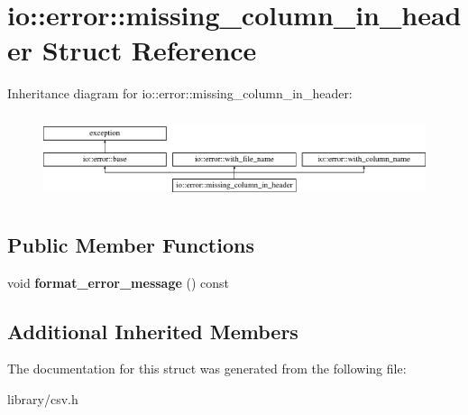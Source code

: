 \hypertarget{structio_1_1error_1_1missing__column__in__header}{}\section{io\+:\+:error\+:\+:missing\+\_\+column\+\_\+in\+\_\+header Struct Reference}
\label{structio_1_1error_1_1missing__column__in__header}
Inheritance diagram for io\+:\+:error\+:\+:missing\+\_\+column\+\_\+in\+\_\+header\+:\begin{figure}[H]
\begin{center}
\leavevmode
\includegraphics[height=2.511211cm]{structio_1_1error_1_1missing__column__in__header}
\end{center}
\end{figure}
\subsection*{Public Member Functions}
\begin{DoxyCompactItemize}
\item 
\mbox{\label{structio_1_1error_1_1missing__column__in__header_a1a2bd4e01a389cb50c6bfae8443317fd}} 
void {\bfseries format\+\_\+error\+\_\+message} () const
\end{DoxyCompactItemize}
\subsection*{Additional Inherited Members}


The documentation for this struct was generated from the following file\+:\begin{DoxyCompactItemize}
\item 
library/csv.\+h\end{DoxyCompactItemize}
